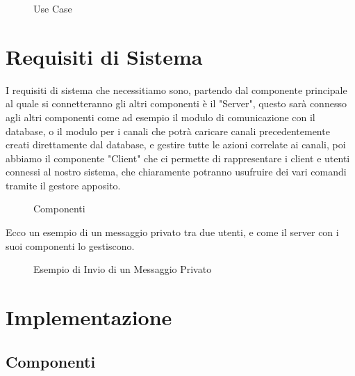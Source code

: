 \documentclass{article}
\begin{document}
\begin{figure}[ht]
    \centering
    
    \caption{Use Case}
    \label{fig:use_case.svg}
\end{figure}


\newpage



\section{Requisiti di Sistema}
I requisiti di sistema che necessitiamo sono, partendo dal componente principale al quale si connetteranno gli altri componenti è il "Server", questo sarà connesso agli altri componenti come ad esempio il modulo di comunicazione con il database, o il modulo per i canali che potrà caricare canali precedentemente creati direttamente dal database, e gestire tutte le azioni correlate ai canali, poi abbiamo il componente "Client" che ci permette di rappresentare i client e utenti connessi al nostro sistema, che chiaramente potranno usufruire dei vari comandi tramite il gestore apposito.

\begin{figure}[ht]
    \centering
    
    \caption{Componenti}
    \label{fig:components.svg}
\end{figure}

\vspace{12pt}
\vspace{12pt}
\vspace{12pt}


Ecco un esempio di un messaggio privato tra due utenti, e come il server con i suoi componenti lo gestiscono.
\vspace{12pt}

\begin{figure}[ht]
    \centering
    
    \caption{Esempio di Invio di un Messaggio Privato}
    \label{fig:message.svg}
\end{figure}


\newpage



\section{Implementazione}
\vspace{12pt}

\subsection{Componenti}
\end{document}
